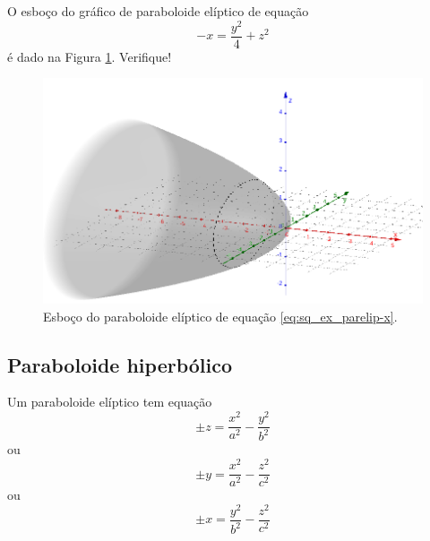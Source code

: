 \begin{ex}
  O esboço do gráfico de paraboloide elíptico de equação
  \begin{equation}\label{eq:sq_ex_parelip-x}
    -x = \frac{y^2}{4}+z^2
  \end{equation}
  é dado na Figura \ref{fig:sq_ex_parelip-x}. Verifique!

    \begin{figure}[H]
    \centering
    \includegraphics[width=\textwidth]{./cap_superquad/dados/fig_sq_ex_parelip-x/fig}
    \caption{Esboço do paraboloide elíptico de equação \eqref{eq:sq_ex_parelip-x}.}
    \label{fig:sq_ex_parelip-x}
  \end{figure}
\end{ex}

\subsection{Paraboloide hiperbólico}

Um paraboloide elíptico tem equação
\begin{equation}
  \pm z = \frac{x^2}{a^2} - \frac{y^2}{b^2}
\end{equation}
ou
\begin{equation}
  \pm y = \frac{x^2}{a^2} - \frac{z^2}{c^2}
\end{equation}
ou
\begin{equation}
  \pm x = \frac{y^2}{b^2} - \frac{z^2}{c^2}
\end{equation}

